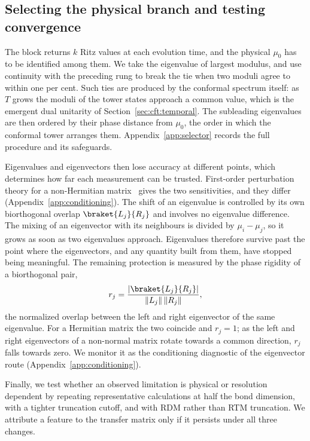 \subsection{Selecting the physical branch and testing convergence}
\label{sec:reach}

The block returns $k$ Ritz values at each evolution time, and the physical $\mu_0$ has to be identified among them. We take the eigenvalue of largest modulus, and use continuity with the preceding rung to break the tie when two moduli agree to within one per cent. Such ties are produced by the conformal spectrum itself: as $T$ grows the moduli of the tower states approach a common value, which is the emergent dual unitarity of Section~\ref{sec:cft:temporal}. The subleading eigenvalues are then ordered by their phase distance from $\mu_0$, the order in which the conformal tower arranges them. Appendix~\ref{app:selector} records the full procedure and its safeguards.

Eigenvalues and eigenvectors then lose accuracy at different points, which determines how far each measurement can be trusted. First-order perturbation theory for a non-Hermitian matrix~\cite{wilkinson1965} gives the two sensitivities, and they differ (Appendix~\ref{app:conditioning}). The shift of an eigenvalue is controlled by its own biorthogonal overlap $\braket{L_j}{R_j}$ and involves no eigenvalue difference. The mixing of an eigenvector with its neighbours is divided by $\mu_i-\mu_j$, so it grows as soon as two eigenvalues approach. Eigenvalues therefore survive past the point where the eigenvectors, and any quantity built from them, have stopped being meaningful. The remaining protection is measured by the phase rigidity of a biorthogonal pair,
\begin{equation}
    r_j = \frac{|\braket{L_j}{R_j}|}{\lVert L_j\rVert\,\lVert R_j\rVert},
    \label{eq:rigidity}
\end{equation}
the normalized overlap between the left and right eigenvector of the same eigenvalue. For a Hermitian matrix the two coincide and $r_j=1$; as the left and right eigenvectors of a non-normal matrix rotate towards a common direction, $r_j$ falls towards zero. We monitor it as the conditioning diagnostic of the eigenvector route (Appendix~\ref{app:conditioning}).

Finally, we test whether an observed limitation is physical or resolution dependent by repeating representative calculations at half the bond dimension, with a tighter truncation cutoff, and with \ac{RDM} rather than \ac{RTM} truncation. We attribute a feature to the transfer matrix only if it persists under all three changes.

